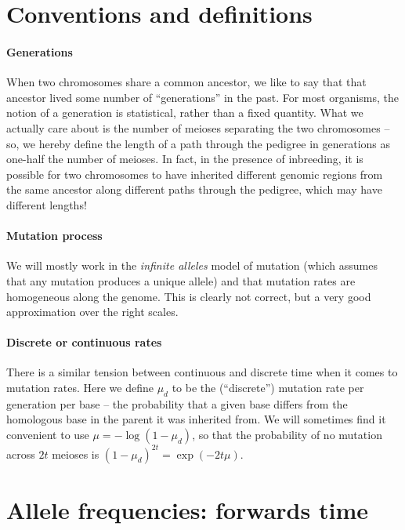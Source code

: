 \section{Conventions and definitions}

\paragraph{Generations}
  When two chromosomes share a common ancestor, we like to say that that ancestor lived some number of ``generations'' in the past.
  For most organisms, the notion of a generation is statistical, rather than a fixed quantity.
  What we actually care about is the number of meioses separating the two chromosomes --
  so, we hereby define the length of a path through the pedigree in generations as one-half the number of meioses.
  In fact, in the presence of inbreeding, it is possible for two chromosomes to have inherited different genomic regions
  from the same ancestor along different paths through the pedigree, which may have different lengths!

\paragraph{Mutation process}
  We will mostly work in the \emph{infinite alleles} model of mutation
  (which assumes that any mutation produces a unique allele)
  and that mutation rates are homogeneous along the genome.
  This is clearly not correct, but a very good approximation over the right scales.


\paragraph{Discrete or continuous rates}
  There is a similar tension between continuous and discrete time when it comes to mutation rates.
  Here we define $\mu_d$ to be the (``discrete'') mutation rate per generation per base 
  -- the probability that a given base differs from the homologous base in the parent it was inherited from.
  We will sometimes find it convenient to use $\mu = -\log(1-\mu_d)$,
  so that the probability of no mutation across $2t$ meioses is $(1-\mu_d)^{2t} = \exp(-2 t \mu )$.

\section{Allele frequencies: forwards time}

